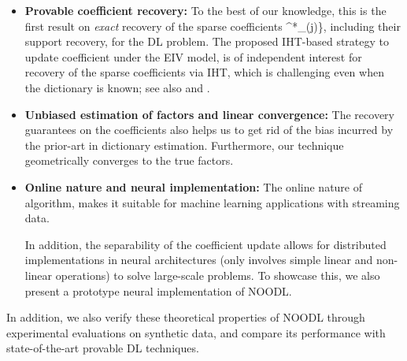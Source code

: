\documentclass{article}
\def\[#1\]{{$#1$}}
\def\b#1{{\mathbf{#1}}}
\begin{document}
 




























\vspace{-3pt}
\begin{itemize}[leftmargin=*]
\setlength{\itemsep}{-0.1pt}
\item \textbf{Provable coefficient recovery:} To the best of our knowledge, this is the first result on \textit{exact} recovery of the sparse coefficients \[\{\b{x}^*_{(j)}\}\], including their support recovery, for the  DL problem. The proposed IHT-based strategy to update coefficient under the EIV model, is of independent interest for recovery of the sparse coefficients via IHT, which is challenging even when the dictionary is known; see also \cite{Yuan2016} and \cite{li2016stochastic}.


\item \textbf{Unbiased estimation of factors and linear convergence:} The recovery guarantees on the coefficients also helps us to get rid of the bias incurred by the prior-art in dictionary estimation. Furthermore, our technique geometrically converges to the true factors.







\item \textbf{Online nature and neural implementation:}  The online nature of algorithm, makes it suitable for machine learning applications with streaming data. 


In addition, the separability of the coefficient update allows for distributed implementations in neural architectures (only involves simple linear and non-linear operations) to solve large-scale problems. To showcase this, we also present a prototype neural implementation of NOODL.

\end{itemize}
\vspace{-2pt}
In addition, we also verify these theoretical properties of NOODL through experimental evaluations on synthetic data, and compare its performance with state-of-the-art provable DL techniques.
\end{document}
